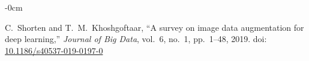 \documentclass[journal,article,submit,pdftex,moreauthors]{Definitions/mdpi}
\begin{document}
\begin{adjustwidth}{-\extralength}{0cm}
{\begin{thebibliography}{999}
C.~Shorten and T.~M.~Khoshgoftaar, “A survey on image data augmentation for deep learning,” \emph{Journal of Big Data}, vol.~6, no.~1, pp.~1–48, 2019. doi: \url{10.1186/s40537-019-0197-0}

\end{thebibliography}
}

%


\end{adjustwidth}
\end{document}
